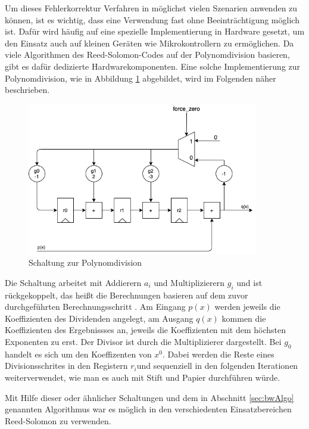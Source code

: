 Um dieses Fehlerkorrektur Verfahren in möglichst vielen Szenarien anwenden zu können, ist es wichtig, dass eine Verwendung fast ohne Beeinträchtigung möglich ist.
Dafür wird häufig auf eine spezielle Implementierung in Hardware gesetzt, um den Einsatz auch auf kleinen Geräten wie Mikrokontrollern zu ermöglichen.
Da viele Algorithmen des Reed-Solomon-Codes auf der Polynomdivision basieren, gibt es dafür dedizierte Hardwarekomponenten.
Eine solche Implementierung zur Polynomdivision, wie in Abbildung \ref{fig:polynomdivCircuit} abgebildet, wird im Folgenden näher beschrieben.
\begin{figure}[ht]
	\centering
	\includegraphics[width=0.9\textwidth]{figures/reed_solomon-divider_diagram.png}
	\caption{Schaltung zur Polynomdivision}
	\label{fig:polynomdivCircuit}
\end{figure}

Die Schaltung arbeitet mit Addierern $a_i$ und Multiplizierern $g_i$ und ist rückgekoppelt, das heißt die Berechnungen basieren auf dem zuvor durchgeführten Berechnungsschritt \cite{masseyShiftregisterSynthesisBCH1969}.
Am Eingang $p(x)$ werden jeweils die Koeffizienten des Dividenden angelegt, am Ausgang $q(x)$ kommen die Koeffizienten des Ergebnissses an, jeweils die Koeffizienten mit dem höchsten Exponenten zu erst.
Der Divisor ist durch die Multiplizierer dargestellt. Bei $g_0$ handelt es sich um den Koeffizenten von $x^0$. 
Dabei werden die Reste eines Divisionsschrites in den Registern $r_i$und sequenziell in den folgenden Iterationen weiterverwendet, wie man es auch mit Stift und Papier durchführen würde.

Mit Hilfe dieser oder ähnlicher Schaltungen und dem in Abschnitt \ref{sec:bwAlgo} genannten Algorithmus war es möglich in den verschiedenten Einsatzbereichen Reed-Solomon zu verwenden.